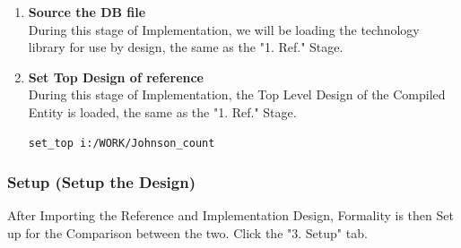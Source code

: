 \documentclass[a4paper,12pt,twoside]{article}
\begin{document}
\begin{enumerate}
\begin{verbatim}
    \end{verbatim}
    \item \textbf{Source the DB file}\\
    During this stage of Implementation, we will be loading the technology library for use by design, the same as the "1. Ref." Stage.
    \item \textbf{Set Top Design of reference}\\
    During this stage of Implementation, the Top Level Design of the Compiled Entity is loaded, the same as the "1. Ref." Stage.
    \begin{verbatim}
set_top i:/WORK/Johnson_count
    \end{verbatim}
\end{enumerate}
\subsubsection{Setup (Setup the Design)}
After Importing the Reference and Implementation Design, Formality is then Set up for the Comparison between the two. Click the "3. Setup" tab.
\end{document}
